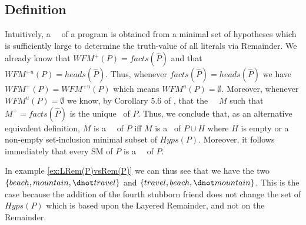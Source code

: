 \documentclass{llncs}
\begin{document}
		\subsection{Definition}
Intuitively, a \MH\ \m\ of a program is obtained from a minimal set of hypotheses which is sufficiently large to determine the truth-value of all literals via Remainder.
			We already know that $WFM^+(P)=facts(\widehat{P})$ and that $WFM^{+u}(P)=heads(\widehat{P})$.
			Thus, whenever $facts(\widehat{P})=heads(\widehat{P})$ we have $WFM^+(P)=WFM^{+u}(P)$ which means $WFM^u(P)=\emptyset$.
			Moreover, whenever $WFM^u(P)=\emptyset$ we know, by Corollary 5.6 of \cite{WFS}, that the \twov\ \m\ $M$ such that 
			$M^+=facts(\widehat{P})$ is the unique \sm\ of $P$.
			Thus, we conclude that, as an alternative equivalent definition, $M$ is a \MH\ \m\ of $P$ iff $M$ is a \sm\ of $P\cup H$ where $H$ is 
			empty or a non-empty set-inclusion minimal subset of $Hyps(P)$.
			Moreover, it follows immediately that every SM of $P$ is a \MH\ \m\ of $P$.			


				In example \ref{ex:LRem(P)vsRem(P)} we can thus see that we have the two \ms\ $\{beach, mountain,\\ \dnot travel\}$ and 
			$\{travel, beach, \dnot mountain\}$.
			This is the case because the addition of the fourth stubborn friend does not change the set of $Hyps(P)$ which is based upon the Layered
			Remainder, and not on the Remainder.
			
\end{document}
